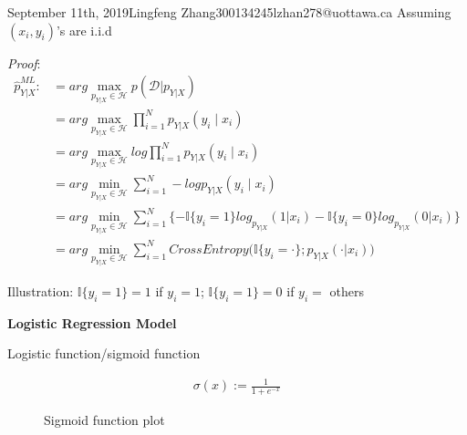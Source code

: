 \documentclass{article}
\begin{document}
\begin{lecture}{September 11th, 2019}{Lingfeng Zhang}{300134245}{lzhan278@uottawa.ca}
Assuming $(x_i,y_i)$'s are i.i.d

\noindent \textit{Proof}:
	\begin{align}
            \hat{p}_{Y|X}^{ML} :&= arg\max_{p_{Y|X} \in \mathcal{H}} p(\mathcal{D}|p_{Y|X}) \nonumber \nonumber \\ 
            &= arg\max_{p_{Y|X} \in \mathcal{H}} \prod_{i=1}^N p_{Y|X}(y_i\mid x_i) \nonumber \\
            &= arg\max_{p_{Y|X} \in \mathcal{H}} log \prod_{i=1}^N p_{Y|X}(y_i\mid x_i) \nonumber \\
            &= arg\min_{p_{Y|X} \in \mathcal{H}} \sum_{i=1}^N -log  p_{Y|X}(y_i\mid x_i) \nonumber \\
            &= arg\min_{p_{Y|X} \in \mathcal{H}} \sum_{i=1}^N \{ -\mathbb{I} \{y_i=1\} log_{p_{Y|X}} (1|x_i) - \mathbb{I} \{y_i = 0\} log_{p_{Y|X}} (0|x_i) \} \nonumber \\
            &= arg\min_{p_{Y|X} \in \mathcal{H}} \sum_{i=1}^N CrossEntropy \big( \mathbb{I} \{y_i = \cdot\} ; p_{Y|X}(\cdot|x_i) \big) \nonumber
        \end{align}

Illustration: $\mathbb{I} \{y_i=1\}=1$ if $y_i=1$; $\mathbb{I} \{y_i=1\}=0$ if $y_i=$ others

\textbf{Logistic Regression Model}

Logistic function/sigmoid function

\begin{eqnarray}
\sigma(x) := \frac{1}{1+e ^{-x}}
\end{eqnarray}

\begin{figure}[ht!]
\centering
{}
\caption{Sigmoid function plot}
\label{fig:sigmoid}
\end{figure}


\end{lecture}
\end{document}
